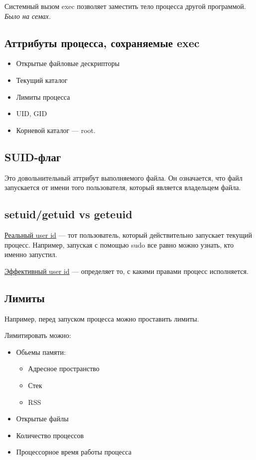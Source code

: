 Системный вызом exec позволяет заместить тело процесса другой программой.
\textit{Было на семах.}

\subsection{Аттрибуты процесса, сохраняемые exec}

\begin{itemize}
	\item Открытые файловые дескрипторы 
	\item Текущий каталог
	\item Лимиты процесса
	\item UID, GID
	\item Корневой каталог --- root.
\end{itemize}

\subsection{SUID-флаг}

Это довольнительный аттрибут выполняемого файла. Он означается, что файл запускается от
имени того пользователя, который является владельцем файла. 

\subsection{setuid/getuid vs geteuid}

\begin{Def}
	\underline{Реальный user id} --- тот пользователь, который действительно запускает текущий процесс. Например, запуская с помощью sudo все равно можно узнать, кто именно запустил.
\end{Def}

\begin{Def}
	\underline{Эффективный user id} --- определяет то, с какими правами процесс исполняется.
\end{Def}

\subsection{Лимиты}

Например, перед запуском процесса можно проставить лимиты. 

Лимитировать можно:

\begin{itemize}
	\item Обьемы памяти:
		\begin{itemize}
			\item Адресное пространство
			\item Стек
			\item RSS
		\end{itemize}
	\item Открытые файлы
	\item Количество процессов
	\item Процессорное время работы процесса
\end{itemize}
